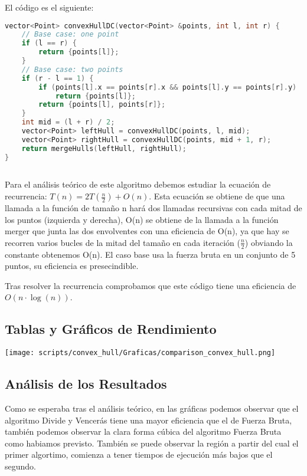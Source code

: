 \documentclass[a4paper,12pt]{article}
\begin{document}
El código es el siguiente:

\begin{lstlisting}[language=C++, caption={Divide y vencerás de \textbf{``La envolvente convexa''}}]
vector<Point> convexHullDC(vector<Point> &points, int l, int r) {
	// Base case: one point
	if (l == r) {
		return {points[l]};
	}
	// Base case: two points
	if (r - l == 1) {
		if (points[l].x == points[r].x && points[l].y == points[r].y)
			return {points[l]};
		return {points[l], points[r]};
	}
	int mid = (l + r) / 2;
	vector<Point> leftHull = convexHullDC(points, l, mid);
	vector<Point> rightHull = convexHullDC(points, mid + 1, r);
	return mergeHulls(leftHull, rightHull);
}
	
\end{lstlisting}

Para el análisis teórico de este algoritmo debemos estudiar la ecuación de recurrencia: $T(n) = 2T(\frac{n}{2}) + O(n)$.
Esta ecuación se obtiene de que una llamada a la función de tamaño n hará dos llamadas recursivas con cada mitad de los puntos (izquierda y derecha),
O(n) se obtiene de la llamada a la función merger que junta las dos envolventes con una eficiencia de O(n), ya que
hay se recorren varios bucles de la mitad del tamaño en cada iteración ($\frac{n}{2}$) obviando la constante obtenemos O(n).
El caso base usa la fuerza bruta en un conjunto de 5 puntos, su eficiencia es presecindible.

Tras resolver la recurrencia comprobamos que este código tiene una eficiencia de $O(n\cdot \log (n))$.

\subsection{Tablas y Gráficos de Rendimiento}

\begin{center}
\texttt{[image: scripts/convex\_hull/Graficas/comparison\_convex\_hull.png]}
\end{center}

\subsection{Análisis de los Resultados}
Como se esperaba tras el análisis teórico, en las gráficas podemos observar que el algoritmo Divide y Vencerás 
tiene una mayor eficiencia que el de Fuerza Bruta, también podemos observar la clara forma cúbica del algoritmo
Fuerza Bruta como habiamos previsto. También se puede observar la región a partir del cual el primer algortimo, comienza 
a tener tiempos de ejecución más bajos que el segundo.
\end{document}
